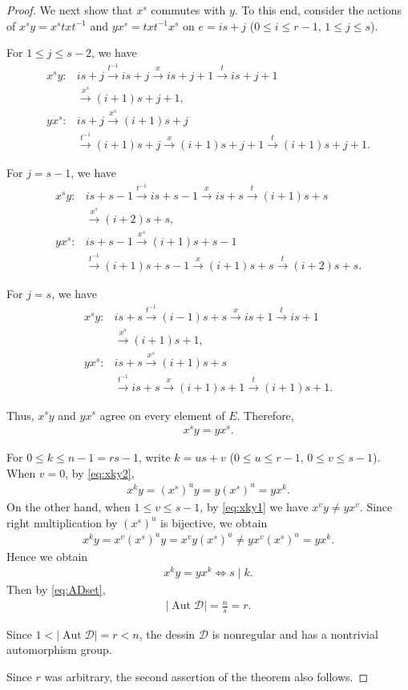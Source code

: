 \documentclass[12pt,reqno]{amsart}
\newcommand{\msD}{\mathscr{D}}
\newcommand{\f}[2]{\frac{#1}{#2}}							%
\newcommand{\vt}[1]{\left\lvert #1 \right\rvert}					%
\newcommand{\onarrow}[1]{\overset{#1}{\longrightarrow}}			%
\DeclareMathOperator{\Aut}{Aut}							%
\theoremstyle{mythmstyle}
\theoremstyle{mydefstyle}
\newcommand{\AD}{\Aut{\msD}}
\numberwithin{equation}{section}
\begin{document}
\begin{proof}
We next show that $x^{s}$ commutes with $y$.
To this end, consider the actions of
$x^{s}y=x^{s}txt^{-1}$ and $yx^{s}=txt^{-1}x^{s}$
on $e=is+j$ ($0 \le i \le r-1$, $1 \le j \le s$).

For $1 \le j \le s-2$, we have
\begin{align}
x^{s}y\colon &is+j \onarrow{t^{-1}} is+j \onarrow{x} is+j+1 \onarrow{t} is+j+1 \\
&\onarrow{x^{s}} (i+1)s+j+1, \\
yx^{s}\colon &is+j \onarrow{x^{s}} (i+1)s+j \\
&\onarrow{t^{-1}} (i+1)s+j \onarrow{x} (i+1)s+j+1 \onarrow{t} (i+1)s+j+1.
\end{align}

For $j = s-1$, we have
\begin{align}
x^{s}y\colon &is+s-1 \onarrow{t^{-1}} is+s-1 \onarrow{x} is+s \onarrow{t} (i+1)s+s \\
&\onarrow{x^{s}} (i+2)s+s, \\
yx^{s}\colon &is+s-1 \onarrow{x^{s}} (i+1)s+s-1 \\
&\onarrow{t^{-1}} (i+1)s+s-1 \onarrow{x} (i+1)s+s \onarrow{t} (i+2)s+s.
\end{align}

For $j = s$, we have
\begin{align}
x^{s}y\colon &is+s \onarrow{t^{-1}} (i-1)s+s \onarrow{x} is+1 \onarrow{t} is+1 \\
&\onarrow{x^{s}} (i+1)s+1, \\
yx^{s}\colon &is+s \onarrow{x^{s}} (i+1)s+s \\
&\onarrow{t^{-1}} is+s \onarrow{x} (i+1)s+1 \onarrow{t} (i+1)s+1.
\end{align}

Thus, $x^{s}y$ and $yx^{s}$ agree on every element of $E$. Therefore,
\begin{align}
\label{eq:xky2}
x^{s}y = yx^{s}.
\end{align}

For $0 \le k \le n-1 = rs-1$, write $k = us+v$ ($0 \le u \le r-1$, $0 \le v \le s-1$).
When $v=0$, by \eqref{eq:xky2},
\begin{align}
x^{k}y = (x^{s})^{u}y = y(x^{s})^{u} = yx^{k}.
\end{align}
On the other hand, when $1 \le v \le s-1$, by \eqref{eq:xky1} we have
$x^{v}y \ne yx^{v}$. Since right multiplication by $(x^{s})^{u}$ is bijective, we obtain
\begin{align}
x^{k}y = x^{v}(x^{s})^{u}y = x^{v}y(x^{s})^{u} \ne yx^{v}(x^{s})^{u} = yx^{k}.
\end{align}
Hence we obtain
\begin{align}
x^{k}y = yx^{k} \iff s \mid k.
\end{align}
Then by \eqref{eq:ADset},
\begin{align}
\vt{\AD} = \f{n}{s} = r.
\end{align}

Since $1<\vt{\AD}=r<n$,
the dessin $\msD$ is nonregular and has a nontrivial automorphism group.

Since $r$ was arbitrary, the second assertion of the theorem also follows.
\end{proof}
\end{document}
